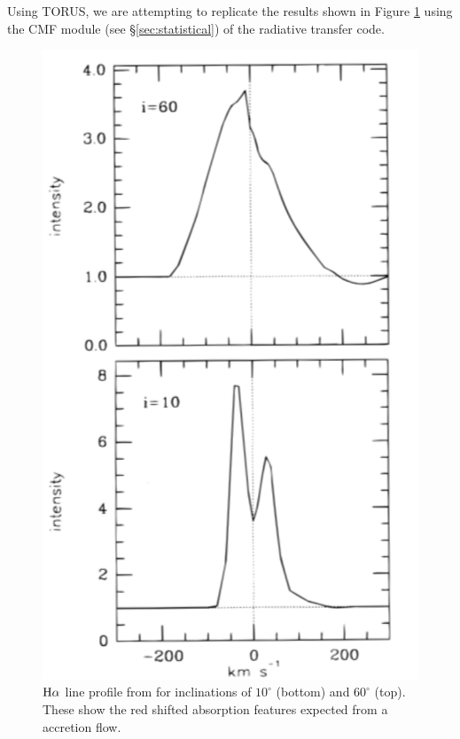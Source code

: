 \documentclass[fleqn,usenatbib]{mnras}
\begin{document}
Using TORUS, we are attempting to replicate the results shown in Figure \ref{fig:muzerolle} using the CMF module (see \S\ref{sec:statistical}) of the radiative transfer code. 
\begin{figure}
    \centering
    \includegraphics[width=\linewidth]{figures/muz}
    \caption{${\rm H}\alpha$ line profile from \citet{1998ApJ...492..743M} for inclinations of $10^{\circ}$  (bottom) and $60^{\circ}$ (top). These show the red shifted absorption features expected from a accretion flow.}
    \label{fig:muzerolle}
\end{figure}
\end{document}

